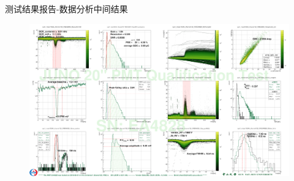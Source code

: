 \documentclass[11pt,compress,xcolor=x11names,UTF8]{beamer}
\begin{document}
\begin{frame}{测试结果报告-数据分析中间结果}
\begin{figure}
\centering
\includegraphics[width=1.0\textwidth]{figures/sys1_mass10244_channel122_snEA4828_lt2.png}
\end{figure}
\end{frame}

\end{document}
